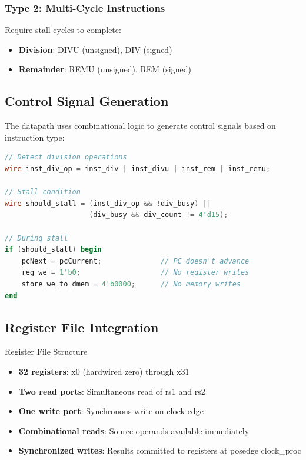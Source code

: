 \documentclass[a4paper, 11pt]{article}
\begin{document}
\subsubsection{Type 2: Multi-Cycle Instructions}
Require stall cycles to complete:
\begin{itemize}
    \item \textbf{Division}: DIVU (unsigned), DIV (signed)
    \item \textbf{Remainder}: REMU (unsigned), REM (signed)
\end{itemize}

\subsection{Control Signal Generation}

The datapath uses combinational logic to generate control signals based on instruction type:

\begin{lstlisting}[language=Verilog, caption=Division Control Logic]
// Detect division operations
wire inst_div_op = inst_div | inst_divu | inst_rem | inst_remu;

// Stall condition
wire should_stall = (inst_div_op && !div_busy) || 
                    (div_busy && div_count != 4'd15);

// During stall
if (should_stall) begin
    pcNext = pcCurrent;              // PC doesn't advance
    reg_we = 1'b0;                   // No register writes
    store_we_to_dmem = 4'b0000;      // No memory writes
end
\end{lstlisting}

\subsection{Register File Integration}

\begin{myblock}{Register File Structure}
\begin{itemize}
    \item \textbf{32 registers}: x0 (hardwired zero) through x31
    \item \textbf{Two read ports}: Simultaneous read of rs1 and rs2
    \item \textbf{One write port}: Synchronous write on clock edge
    \item \textbf{Combinational reads}: Source operands available immediately
    \item \textbf{Synchronized writes}: Results committed to registers at posedge clock\_proc
\end{itemize}
\end{myblock}
\end{document}
